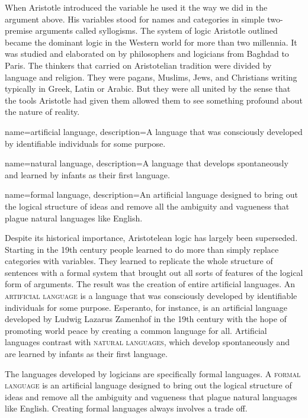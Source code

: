 When Aristotle introduced the variable he used it the way we did in the argument above. His variables stood for names and categories in simple two-premise arguments called syllogisms. The system of logic Aristotle outlined became the dominant logic in the Western world for more than two millennia. It was studied and elaborated on by philosophers and logicians from Baghdad to Paris. The thinkers that carried on Aristotelian tradition were divided by language and religion. They were pagans, Muslims, Jews, and Christians writing typically in Greek, Latin or Arabic. But they were all united by the sense that the tools Aristotle had given them allowed them to see something profound about the nature of reality.

{
name=artificial language,
description={A language that was consciously developed by identifiable individuals for some purpose.}
}

{
name=natural language,
description={A language that develops spontaneously and learned by infants as their first language.}
}

{
name=formal language,
description={An artificial language designed to bring out the logical structure of  ideas and remove all the ambiguity and vagueness that plague natural languages like English.}
}

Despite its historical importance, Aristotelean logic has largely been superseded. Starting in the 19th century people learned to do more than simply replace categories with variables. They learned to replicate the whole structure of sentences with a formal system that brought out all sorts of features of the logical form of arguments. The result was the creation of entire artificial languages. An \textsc{\gls{artificial language}} \label{def:artificial_language} is a language that was consciously developed by identifiable individuals for some purpose. Esperanto, for instance, is an artificial language developed by Ludwig Lazarus Zamenhof in the 19th century with the hope of promoting world peace by creating a common language for all. Artificial languages contrast with \textsc{\glspl{natural language}}, \label{def:natural_language} which develop spontaneously and are learned by infants as their first language. 

The languages developed by logicians are specifically formal languages. A \textsc{\gls{formal language}} \label{def:formal_language} is an artificial language designed to bring out the logical structure of ideas and remove all the ambiguity and vagueness that plague natural languages like English. Creating formal languages always involves a trade off. %

